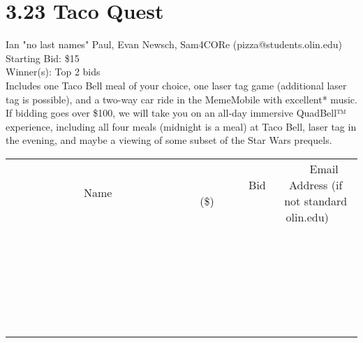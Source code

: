 \documentclass[11pt]{article}
\begin{document}
\section*{3.23 Taco Quest}
Ian "no last names" Paul, Evan Newsch, Sam4CORe (pizza@students.olin.edu) \\
Starting Bid: \$15 \\
Winner(s): 
Top 2 bids \\
Includes one Taco Bell meal of your choice, one laser tag game (additional laser tag is possible), and a two-way car ride in the MemeMobile with excellent* music. If bidding goes over \$100, we will take you on an all-day immersive QuadBell™ experience, including all four meals (midnight is a meal) at Taco Bell, laser tag in the evening, and maybe a viewing of some subset of the Star Wars prequels. \\[6ex]
\begin{tabular}{c c c}
~~~~~~~~~~~~~Name~~~~~~~~~~~~~ & ~~~~~~~~~Bid (\$)~~~~~~~~~ & ~~~Email Address (if not standard olin.edu)~~~ \\
 & & \\
\hline
 & & \\
\hline
 & & \\
\hline
 & & \\
\hline
 & & \\
\hline
 & & \\
\hline
 & & \\
\hline
 & & \\
\hline
 & & \\
\hline
 & & \\
\hline
 & & \\
\hline
 & & \\
\hline
 & & \\
\hline
 & & \\
\hline
 & & \\
\hline
 & & \\
\hline
 & & \\
\hline
 & & \\
\hline
 & & \\
\hline
 & & \\
\hline
 & & \\
\hline
 & & \\
\hline
 & & \\
\hline
 & & \\
\hline
 & & \\
\hline
 & & \\
\hline
\end{tabular}
\clearpage
\end{document}
